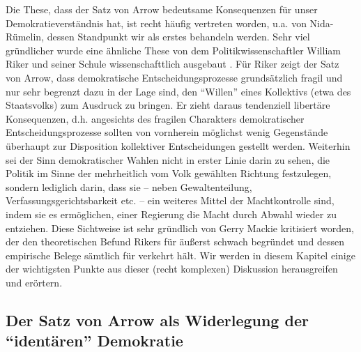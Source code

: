 Die These, dass der Satz von Arrow bedeutsame Konsequenzen für unser
Demokratieverständnis hat, ist recht häufig vertreten worden, u.a. von
Nida-Rümelin, dessen Standpunkt wir als erstes behandeln werden. Sehr viel
gründlicher wurde eine ähnliche These von dem Politikwissenschaftler William
Riker und seiner Schule wissenschafttlich ausgebaut \cite[]{riker:1982}. Für
Riker zeigt der Satz von Arrow, dass demokratische Entscheidungsprozesse
grundsätzlich fragil und nur sehr begrenzt dazu in der Lage sind, den "`Willen"'
eines Kollektivs (etwa des Staatsvolks) zum Ausdruck zu bringen. Er zieht daraus
tendenziell libertäre Konsequenzen, d.h. angesichts des fragilen Charakters
demokratischer Entscheidungsprozesse sollten von vornherein möglichst wenig
Gegenstände überhaupt zur Disposition kollektiver Entscheidungen gestellt werden.
Weiterhin sei der Sinn demokratischer Wahlen nicht in erster Linie darin zu
sehen, die Politik im Sinne der mehrheitlich vom Volk gewählten Richtung
festzulegen, sondern lediglich darin, dass sie -- neben Gewaltenteilung,
Verfassungsgerichtsbarkeit etc. -- ein weiteres Mittel der Machtkontrolle sind,
indem sie es ermöglichen, einer Regierung die Macht durch Abwahl wieder zu
entziehen. Diese Sichtweise ist sehr gründlich von Gerry Mackie kritisiert
worden, der den theoretischen Befund Rikers für äußerst schwach begründet und
dessen empirische Belege sämtlich für verkehrt hält. Wir werden in diesem Kapitel
einige der wichtigsten Punkte aus dieser (recht komplexen) Diskussion
herausgreifen und erörtern.

\subsection{Der Satz von Arrow als Widerlegung der "`identären"' Demokratie}


